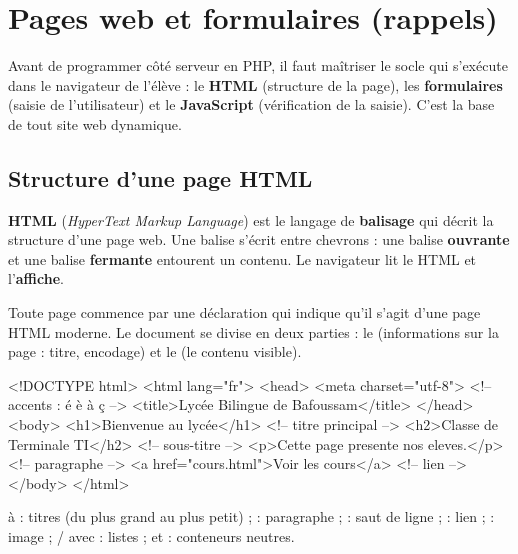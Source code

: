 \chapter{Pages web et formulaires (rappels)}

\begin{synthese}[Au programme]
Avant de programmer côté serveur en PHP, il faut maîtriser le socle qui s'exécute
dans le navigateur de l'élève : le \textbf{HTML} (structure de la page), les
\textbf{formulaires} (saisie de l'utilisateur) et le \textbf{JavaScript} (vérification
de la saisie). C'est la base de tout site web dynamique.
\end{synthese}

\section{Structure d'une page HTML}

\begin{definition}
\textbf{HTML} (\emph{HyperText Markup Language}) est le langage de \textbf{balisage}
qui décrit la structure d'une page web. Une balise s'écrit entre chevrons : une
balise \textbf{ouvrante}  et une balise \textbf{fermante} 
entourent un contenu. Le navigateur lit le HTML et l'\textbf{affiche}.
\end{definition}

Toute page commence par une déclaration  qui indique qu'il
s'agit d'une page HTML moderne. Le document se divise en deux parties :
le  (informations sur la page : titre, encodage) et le 
(le contenu visible).

\begin{codehtml}
<!DOCTYPE html>
<html lang="fr">
<head>
  <meta charset="utf-8">           <!-- accents : é è à ç -->
  <title>Lycée Bilingue de Bafoussam</title>
</head>
<body>
  <h1>Bienvenue au lycée</h1>       <!-- titre principal -->
  <h2>Classe de Terminale TI</h2>   <!-- sous-titre -->
  <p>Cette page presente nos eleves.</p>  <!-- paragraphe -->
  <a href="cours.html">Voir les cours</a> <!-- lien -->
</body>
</html>
\end{codehtml}


\begin{propriete}
 à  : titres (du plus grand au plus petit) ;  :
paragraphe ;  : saut de ligne ;  : lien ;
 : image ; / avec  :
listes ;  et  : conteneurs neutres.
\end{propriete}

